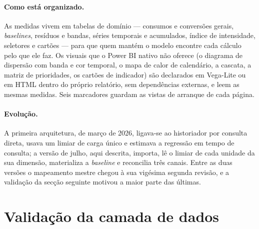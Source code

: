\paragraph{Como está organizado.} As medidas vivem em tabelas de domínio
--- consumos e conversões gerais, \emph{baselines}, resíduos e bandas,
séries temporais e acumulados, índice de intensidade, seletores e cartões
--- para que quem mantém o modelo encontre cada cálculo pelo que ele faz.
Os visuais que o Power BI nativo não oferece (o diagrama de dispersão com
banda e cor temporal, o mapa de calor de calendário, a cascata, a matriz
de prioridades, os cartões de indicador) são declarados em Vega-Lite ou em
HTML dentro do próprio relatório, sem dependências externas, e leem as
mesmas medidas. Seis marcadores guardam as vistas de arranque de cada
página.

\paragraph{Evolução.} A primeira arquitetura, de março de 2026, ligava-se
ao historiador por consulta direta, usava um limiar de carga único e
estimava a regressão em tempo de consulta; a versão de julho, aqui
descrita, importa, lê o limiar de cada unidade da sua dimensão,
materializa a \emph{baseline} e reconcilia três canais. Entre as duas
versões o mapeamento mestre chegou à sua vigésima segunda revisão, e a
validação da secção seguinte motivou a maior parte das últimas.

\section{Validação da camada de dados}
\label{sec:validacao-dados}


